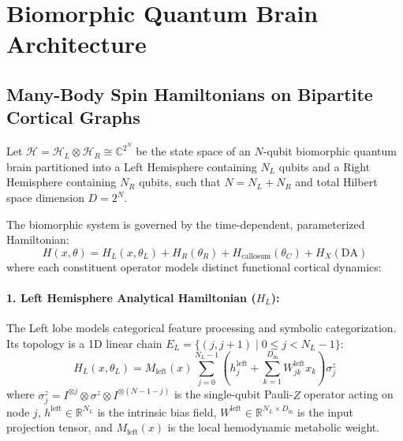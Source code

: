 \documentclass[10pt,twocolumn,3p]{article}
\begin{document}
\section{Biomorphic Quantum Brain Architecture}
\label{sec:architecture}

\subsection{Many-Body Spin Hamiltonians on Bipartite Cortical Graphs}
\label{subsec:hamiltonian_formulation}

Let $\mathcal{H} = \mathcal{H}_L \otimes \mathcal{H}_R \cong \mathbb{C}^{2^N}$ be the state space of an $N$-qubit biomorphic quantum brain partitioned into a Left Hemisphere containing $N_L$ qubits and a Right Hemisphere containing $N_R$ qubits, such that $N = N_L + N_R$ and total Hilbert space dimension $D = 2^N$.

The biomorphic system is governed by the time-dependent, parameterized Hamiltonian:
\begin{equation}
    H(x, \theta) = H_L(x, \theta_L) + H_R(\theta_R) + H_{\text{callosum}}(\theta_C) + H_X(\text{DA})
    \label{eq:total_hamiltonian}
\end{equation}
where each constituent operator models distinct functional cortical dynamics:

\paragraph{1. Left Hemisphere Analytical Hamiltonian ($H_L$):}
The Left lobe models categorical feature processing and symbolic categorization. Its topology is a 1D linear chain $E_L = \{(j, j+1) \mid 0 \le j < N_L - 1\}$:
\begin{equation}
    H_L(x, \theta_L) = M_{\text{left}}(x) \sum_{j=0}^{N_L - 1} \left( h_j^{\text{left}} + \sum_{k=1}^{D_{\text{in}}} W_{jk}^{\text{left}} x_k \right) \sigma_j^z
    \label{eq:H_left}
\end{equation}
where $\sigma_j^z = I^{\otimes j} \otimes \sigma^z \otimes I^{\otimes (N - 1 - j)}$ is the single-qubit Pauli-$Z$ operator acting on node $j$, $h^{\text{left}} \in \mathbb{R}^{N_L}$ is the intrinsic bias field, $W^{\text{left}} \in \mathbb{R}^{N_L \times D_{\text{in}}}$ is the input projection tensor, and $M_{\text{left}}(x)$ is the local hemodynamic metabolic weight.
\end{document}
